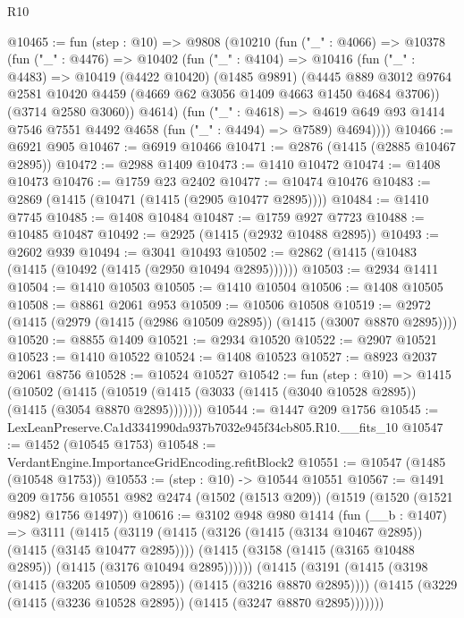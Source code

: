 \begin{lexlean}{R10}
\begin{coremodule}
@10465 := fun (step : @10) =>
  @9808
    (@10210
      (fun ("_" : @4066) =>
      @10378
        (fun ("_" : @4476) =>
        @10402
          (fun ("_" : @4104) =>
          @10416
            (fun ("_" : @4483) =>
            @10419
              (@4422 @10420)
              (@1485 @9891)
              (@4445
                @889
                @3012
                @9764
                @2581
                @10420
                @4459
                (@4669 @62 @3056 @1409 @4663 @1450 @4684 @3706))
              (@3714 @2580 @3060))
            @4614)
          (fun ("_" : @4618) =>
          @4619 @649 @93 @1414 @7546 @7551 @4492 @4658 (fun ("_" : @4494) => @7589) @4694))))
@10466 := @6921 @905
@10467 := @6919 @10466
@10471 := @2876 (@1415 (@2885 @10467 @2895))
@10472 := @2988 @1409
@10473 := @1410 @10472
@10474 := @1408 @10473
@10476 := @1759 @23 @2402
@10477 := @10474 @10476
@10483 := @2869 (@1415 (@10471 (@1415 (@2905 @10477 @2895))))
@10484 := @1410 @7745
@10485 := @1408 @10484
@10487 := @1759 @927 @7723
@10488 := @10485 @10487
@10492 := @2925 (@1415 (@2932 @10488 @2895))
@10493 := @2602 @939
@10494 := @3041 @10493
@10502 := @2862 (@1415 (@10483 (@1415 (@10492 (@1415 (@2950 @10494 @2895))))))
@10503 := @2934 @1411
@10504 := @1410 @10503
@10505 := @1410 @10504
@10506 := @1408 @10505
@10508 := @8861 @2061 @953
@10509 := @10506 @10508
@10519 := @2972 (@1415 (@2979 (@1415 (@2986 @10509 @2895)) (@1415 (@3007 @8870 @2895))))
@10520 := @8855 @1409
@10521 := @2934 @10520
@10522 := @2907 @10521
@10523 := @1410 @10522
@10524 := @1408 @10523
@10527 := @8923 @2037 @2061 @8756
@10528 := @10524 @10527
@10542 := fun (step : @10) =>
  @1415
    (@10502
      (@1415 (@10519 (@1415 (@3033 (@1415 (@3040 @10528 @2895)) (@1415 (@3054 @8870 @2895)))))))
@10544 := @1447 @209 @1756
@10545 := LexLeanPreserve.Ca1d3341990da937b7032e945f34cb805.R10.__fits_10
@10547 := @1452 (@10545 @1753)
@10548 := VerdantEngine.ImportanceGridEncoding.refitBlock2
@10551 := @10547 (@1485 (@10548 @1753))
@10553 := (step : @10) -> @10544 @10551
@10567 := @1491
    @209
    @1756
    @10551
    @982
    @2474
    (@1502 (@1513 @209))
    (@1519 (@1520 (@1521 @982) @1756 @1497))
@10616 := @3102
    @948
    @980
    @1414
    (fun (__b : @1407) =>
    @3111
      (@1415
        (@3119
          (@1415 (@3126 (@1415 (@3134 @10467 @2895)) (@1415 (@3145 @10477 @2895))))
          (@1415 (@3158 (@1415 (@3165 @10488 @2895)) (@1415 (@3176 @10494 @2895))))))
      (@1415
        (@3191
          (@1415 (@3198 (@1415 (@3205 @10509 @2895)) (@1415 (@3216 @8870 @2895))))
          (@1415 (@3229 (@1415 (@3236 @10528 @2895)) (@1415 (@3247 @8870 @2895)))))))

\end{coremodule}
\end{lexlean}
